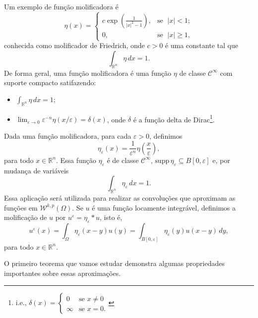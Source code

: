 \documentclass[a4paper, 11pt]{book}
\theoremstyle{definition}
\newcommand{\bR}{\mathbb{R}}
\newcommand{\cC}{\mathcal{C}}
\newcommand{\cW}{\mathcal{W}}
\newcommand{\supp}{\mathrm{supp}\,}
\begin{document}
Um exemplo de função molificadora é
\begin{equation} \label{eq:molificador-friedrich}
    \eta(x) =
    \left\{
        \begin{array}{lr}
            c \exp \left( \frac{1}{|x|^2 - 1} \right), &\! \text{se }\; |x| < 1;\\
            0, &\!\text{se }\; |x| \geqslant 1,
        \end{array}
    \right.
\end{equation}
conhecida como molificador de Friedrich, onde $c > 0$ é uma constante tal que
\[
    \int_{\bR^n} \eta \,dx = 1.
\]
De forma geral, uma função molificadora é uma função $\eta$ de classe $\cC^\infty$ com suporte compacto satifazendo:
\begin{itemize}[leftmargin=*, label=\small{$\bullet$}]
    \item $\displaystyle \int_{\bR^n} \eta \,dx = 1$;
    \item $\displaystyle \lim_{\varepsilon \to 0} \varepsilon^{-n}\eta(x/\varepsilon) = \delta(x)$, onde $\delta$ é a função delta de Dirac\footnote{i.e., $\delta(x) = 
    \left\{  
        \begin{array}{ll}
            0 &\text{se } x \neq 0\\
            \infty &\text{se } x = 0.
        \end{array}
    \right.
    $}.
\end{itemize}
Dada uma função molificadora, para cada $\varepsilon > 0$, definimos
\begin{equation} \label{eq:eta-epsilon}
    \eta_\varepsilon(x) = \frac{1}{\varepsilon^n} \eta\left( \frac{x}{\varepsilon} \right), 
\end{equation}
para todo $x \in \bR^n$. Essa função $\eta_\varepsilon$ é de classe $\cC^\infty$, $\supp \eta_\varepsilon \subseteq B[0,\varepsilon]$ e, por mudança de variáveis
\begin{equation} \label{eq:integral1}
    \int_{\bR^n} \eta_\varepsilon \,dx = 1.
\end{equation}
Essa aplicação será utilizada para realizar as convoluções que aproximam as funções em $\cW^{k,p}(\Omega)$. Se $u$ é uma função locamente integrável, definimos a molificação de $u$ por $u^\varepsilon = \eta_\varepsilon * u$, isto é,
\[
    u^\varepsilon(x) = \int_\Omega \eta_\varepsilon(x-y) u(y) = \int_{B[0,\varepsilon]} \eta_\varepsilon(y) u(x-y) \,dy,
\]
para todo $x \in \bR^n$.

O primeiro teorema que vamos estudar demonstra algumas propriedades importantes sobre essas aproximações.
\end{document}
